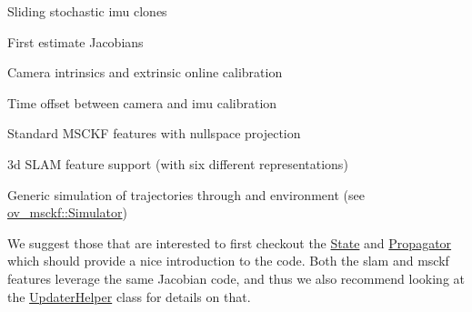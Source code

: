 \begin{DoxyItemize}
\item Sliding stochastic imu clones
\item First estimate Jacobians
\item Camera intrinsics and extrinsic online calibration
\item Time offset between camera and imu calibration
\item Standard M\+S\+C\+KF features with nullspace projection
\item 3d S\+L\+AM feature support (with six different representations)
\item Generic simulation of trajectories through and environment (see \hyperlink{classov__msckf_1_1Simulator}{ov\+\_\+msckf\+::\+Simulator})
\end{DoxyItemize}

We suggest those that are interested to first checkout the \hyperlink{classov__msckf_1_1State}{State} and \hyperlink{classov__msckf_1_1Propagator}{Propagator} which should provide a nice introduction to the code. Both the slam and msckf features leverage the same Jacobian code, and thus we also recommend looking at the \hyperlink{classov__msckf_1_1UpdaterHelper}{Updater\+Helper} class for details on that. 